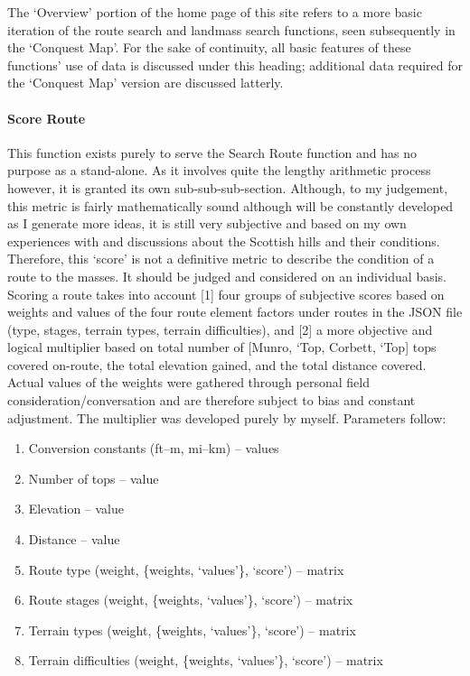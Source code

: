 \documentclass[11pt, english]{article}
\begin{document}
	The `Overview' portion of the home page of this site refers to a more basic iteration of the route search and landmass search functions, seen subsequently in the `Conquest Map'. For the sake of continuity, all basic features of these functions' use of data is discussed under this heading; additional data required for the `Conquest Map' version are discussed latterly.

			\paragraph{Score Route}

	This function exists purely to serve the Search Route function and has no purpose as a stand-alone. As it involves quite the lengthy arithmetic process however, it is granted its own sub-sub-sub-section. Although, to my judgement, this metric is fairly mathematically sound although will be constantly developed as I generate more ideas, it is still very subjective and based on my own experiences with and discussions about the Scottish hills and their conditions. Therefore, this `score' is not a definitive metric to describe the condition of a route to the masses. It should be judged and considered on an individual basis.\\

	Scoring a route takes into account [1] four groups of subjective scores based on weights and values of the four route element factors under routes in the JSON file (type, stages, terrain types, terrain difficulties), and [2] a more objective and logical multiplier based on total number of [Munro, `Top, Corbett, `Top] tops covered on-route, the total elevation gained, and the total distance covered. Actual values of the weights were gathered through personal field consideration/conversation and are therefore subject to bias and constant adjustment. The multiplier was developed purely by myself. Parameters follow:

	\begin{enumerate}
	\setlength\itemsep{0cm}
		\item Conversion constants (ft--m, mi--km) -- values
		\item Number of tops -- value
		\item Elevation -- value
		\item Distance -- value
		\item Route type (weight, \{weights, `values'\}, `score') -- matrix
		\item Route stages (weight, \{weights, `values'\}, `score') -- matrix
		\item Terrain types (weight, \{weights, `values'\}, `score') -- matrix
		\item Terrain difficulties (weight, \{weights, `values'\}, `score') -- matrix
	\end{enumerate}
\end{document}
